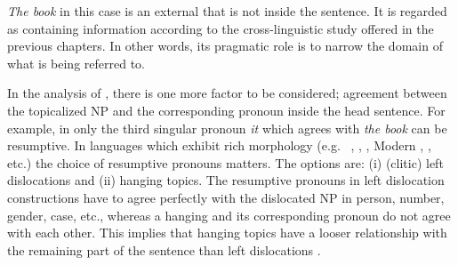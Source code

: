 
\textit{The book} in this case is an external  that is not
inside the sentence. It is regarded as containing 
information according to the cross-linguistic study offered in the
previous chapters. In other words, its pragmatic role is to narrow the
domain of what is being referred to.



In the analysis of , there is one more factor to be
considered; agreement between the topicalized NP and the corresponding
pronoun inside the head sentence. For example, in
 only the third singular pronoun
\textit{it} which agrees with \textit{the book} can be resumptive. In
languages which exhibit rich morphology (e.g.\ 
\citep{cinque:77,rizzi:97}, 
\citep{rivero:80,zagona:02,bildhauer:08}, 
\citep{grohmann:01}, Modern 
\citep{alexopoulou:kolliakou:02},  \citep{sturgeon:10},
etc.) the choice of resumptive pronouns matters. The options are: (i)
(clitic) left dislocations and (ii) hanging topics. The resumptive
pronouns in left dislocation constructions have to agree perfectly
with the dislocated NP in person, number, gender, case, etc., whereas
a hanging  and its corresponding pronoun do not agree with
each other.  This implies that hanging topics have a looser
relationship with the remaining part of the sentence than left
dislocations \citep{frascarelli:00}.






